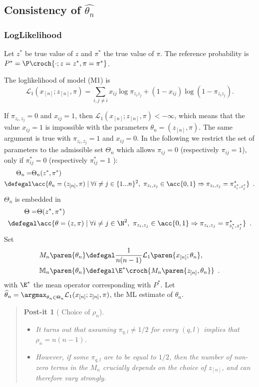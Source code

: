 \documentclass[11pt]{article}
\newcommand{\xn}{x_{[n]}}
\newcommand{\zn}{z_{[n]}}
\renewcommand{\L}{\mathcal{L}}
\newtheorem{postita}{Post-it}
\newenvironment{postit}[1][]{\begin{quote} \begin{postita}[ #1]}{\end{postita} \end{quote}}
\begin{document}
\subsection{Consistency of $\widehat{\theta_n}$}
\subsubsection{LogLikelihood}

Let $z^*$ be true value of $z$ and  $\pi^*$ the true value of $\pi$. The reference probability is $P^*=\P\croch{\cdot ; z=z^*, \pi=\pi^*}$.

The loglikelihood of model (M1) is  $$\L_1(\xn; \zn, \pi)= \sum_{i,j \neq i}x_{ij}\log\pi_{z_iz_j}+(1-x_{ij})\log(1-\pi_{z_iz_j}) .$$

 If $\pi_{z_i,z_j}=0$ and $x_{ij} =1$, then  $\L_1(\xn;\zn,\pi) < -\infty$, which means that the value  $x_{ij}=1$ is impossible with the parameters $\theta_n=(\zn,\pi)$. The same argument is true with $\pi_{z_i,z_j}=1$ and $x_{ij}=0$. In the following we restrict the set of parameters to the admissible set $\Theta_n$ which allows $\pi_{ij}=0$ (respectively $\pi_{ij}=1$), only if $\pi^*_{ij}=0$ (respectively $\pi^*_{ij}=1$ ):
  \begin{align*}
        \Theta_n = & \Theta_n(z^*,\pi^*)\\
     \defegal & \acc{\theta_n=(\zn,\pi)\mid \forall  i\neq j \in  \{ 1...n \} ^2,\ \pi_{z_i,z_j}\in\acc{0,1} \Rightarrow \pi_{z_i,z_j}=\pi^*_{z^*_i,z^*_j}}\enspace.
\end{align*}
$\Theta_n$ is embedded in
\begin{align*}
        \Theta = & \Theta(z^*,\pi^*)\\
     \defegal & \acc{\theta=(z,\pi)\mid \forall  i\neq j \in  \N^2,\ \pi_{z_i,z_j}\in\acc{0,1} \Rightarrow \pi_{z_i,z_j}=\pi^*_{z^*_i,z^*_j}}\enspace.
\end{align*}
Set
\begin{align*}
        M_n\paren{\theta_n} & \defegal \frac{1}{n(n-1)} \L_1\paren{\xn;\theta_n},\\
        \mathbb{M}_n\paren{\theta_n}&\defegal \E^*\croch{M_n\paren{\zn,\theta_n}}\enspace.
\end{align*}
with $\E^*$ the mean operator corresponding with $P^*$. Let $\widehat{\theta}_n=\argmax_{\theta_n \in \Theta_n} \L_1(\xn; \zn,\pi)$, the ML estimate of $\theta_n$.
\begin{postit}[Choice of $\rho_n$]
~\\
\begin{itemize}
\item It turns out that assuming $\pi_{q,l}\neq 1/2$ for every $(q,l)$ implies that $\rho_n=n(n-1)$.

\item However, if some $\pi_{q,l}$ are to be equal to $1/2$, then the number of non-zero terms in the $M_n$ crucially depends on the choice of $\zn$, and can therefore vary strongly.
\end{itemize}
\end{postit}
\end{document}
